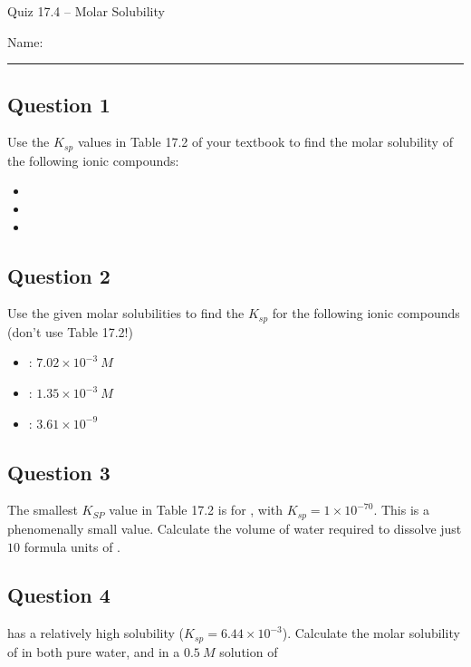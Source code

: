 \documentclass[11pt, letterpaper]{memoir}
\begin{document}
	\begin{center}
		{\large	Quiz 17.4 -- Molar Solubility}
	\end{center}
	{\large Name: \rule[-1mm]{4in}{.1pt} 

\subsection*{Question 1}
Use the $K_{sp}$ values in Table 17.2 of your textbook to find the molar solubility of the following ionic compounds:
\begin{itemize}
	\item {}
	
	\vspace{2em}
	\item {}
	
	\vspace{2em}
	\item {}
\end{itemize}

\vspace{1em}
\subsection*{Question 2}
Use the given molar solubilities to find the $K_{sp}$ for the following ionic compounds (don't use Table 17.2!)
\begin{itemize}
	\item {} : $7.02\times10^{-3}~M$
	
	\vspace{2em}
	\item {} : $1.35\times10^{-3}~M$
	
	\vspace{2em}
	\item {} : $3.61\times10^{-9}$
	
\end{itemize}

\vspace{1em}
\subsection*{Question 3}
The smallest $K_{SP}$ value in Table 17.2 is for , with $K_{sp}=1\times10^{-70}$. This is a phenomenally small value. Calculate the volume of water required to dissolve just $10$ formula units of . 

\vspace{4em}
\subsection*{Question 4}
 has a relatively high solubility ($K_{sp}=6.44\times10^{-3}$). Calculate the molar solubility of  in both pure water, and in a $0.5~M$ solution of 

}
\end{document}
